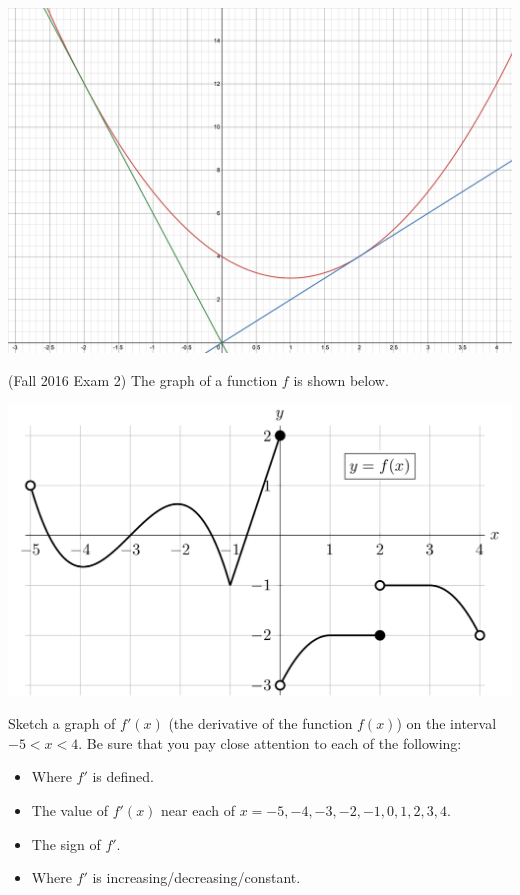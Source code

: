 \documentclass[11pt]{exam}
\begin{document}
\begin{questions}
\begin{solution}
\begin{center}
      \includegraphics[scale=0.3]{parabola_with_tangents}
     \end{center}
    \end{solution}
  \question (Fall 2016 Exam 2) The graph of a function $f$ is shown below.
    \begin{center}
      \includegraphics[scale=0.6]{graphf.png}
    \end{center}
    Sketch a graph of $f'(x)$ (the derivative of the function $f(x)$) on the interval
$-5 < x < 4$. Be sure that you pay close attention to each of the following:
 \begin{itemize}
\item Where $f'$ is defined.
\item The value of $f'(x)$ near each of $x = -5, -4, -3, -2, -1, 0, 1, 2, 3, 4$.
\item The sign of $f'$.
\item Where $f'$ is increasing/decreasing/constant.
\end{itemize}

\end{questions}
\end{document}
